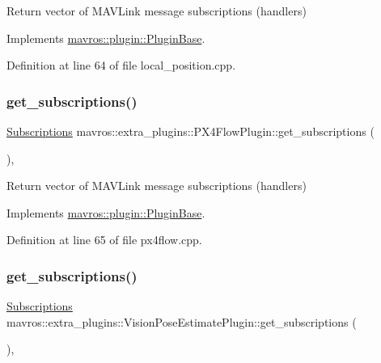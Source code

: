 Return vector of M\+A\+V\+Link message subscriptions (handlers) 



Implements \mbox{\hyperlink{group__plugin_gaf4e23fec6d7436a62cbf0942a2e5791c}{mavros\+::plugin\+::\+Plugin\+Base}}.



Definition at line 64 of file local\+\_\+position.\+cpp.

\mbox{\label{group__plugin_ga70d7cb3f7611e394d7a0d85ca5e2dcf5}} 
\subsubsection{\texorpdfstring{get\_subscriptions()}{get\_subscriptions()}\hspace{0.1cm}{\footnotesize\ttfamily [25/41]}}
{\footnotesize\ttfamily \mbox{\hyperlink{group__plugin_ga8967d61fc77040e0c3ea5a4585d62a09}{Subscriptions}} mavros\+::extra\+\_\+plugins\+::\+P\+X4\+Flow\+Plugin\+::get\+\_\+subscriptions (\begin{DoxyParamCaption}{ }\end{DoxyParamCaption})\hspace{0.3cm}{\ttfamily [inline]}, {\ttfamily [virtual]}}



Return vector of M\+A\+V\+Link message subscriptions (handlers) 



Implements \mbox{\hyperlink{group__plugin_gaf4e23fec6d7436a62cbf0942a2e5791c}{mavros\+::plugin\+::\+Plugin\+Base}}.



Definition at line 65 of file px4flow.\+cpp.

\mbox{\label{group__plugin_ga89567b4d29bc8a805270e131c89fab3d}} 
\subsubsection{\texorpdfstring{get\_subscriptions()}{get\_subscriptions()}\hspace{0.1cm}{\footnotesize\ttfamily [26/41]}}
{\footnotesize\ttfamily \mbox{\hyperlink{group__plugin_ga8967d61fc77040e0c3ea5a4585d62a09}{Subscriptions}} mavros\+::extra\+\_\+plugins\+::\+Vision\+Pose\+Estimate\+Plugin\+::get\+\_\+subscriptions (\begin{DoxyParamCaption}{ }\end{DoxyParamCaption})\hspace{0.3cm}{\ttfamily [inline]}, {\ttfamily [virtual]}}



